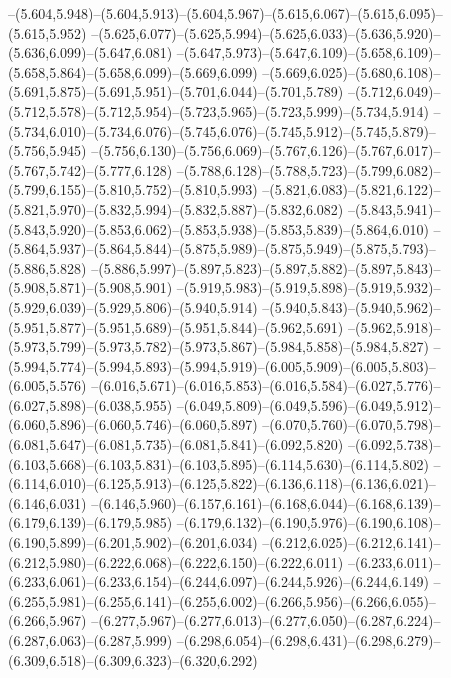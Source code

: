   --(5.604,5.948)--(5.604,5.913)--(5.604,5.967)--(5.615,6.067)--(5.615,6.095)--(5.615,5.952)%
  --(5.625,6.077)--(5.625,5.994)--(5.625,6.033)--(5.636,5.920)--(5.636,6.099)--(5.647,6.081)%
  --(5.647,5.973)--(5.647,6.109)--(5.658,6.109)--(5.658,5.864)--(5.658,6.099)--(5.669,6.099)%
  --(5.669,6.025)--(5.680,6.108)--(5.691,5.875)--(5.691,5.951)--(5.701,6.044)--(5.701,5.789)%
  --(5.712,6.049)--(5.712,5.578)--(5.712,5.954)--(5.723,5.965)--(5.723,5.999)--(5.734,5.914)%
  --(5.734,6.010)--(5.734,6.076)--(5.745,6.076)--(5.745,5.912)--(5.745,5.879)--(5.756,5.945)%
  --(5.756,6.130)--(5.756,6.069)--(5.767,6.126)--(5.767,6.017)--(5.767,5.742)--(5.777,6.128)%
  --(5.788,6.128)--(5.788,5.723)--(5.799,6.082)--(5.799,6.155)--(5.810,5.752)--(5.810,5.993)%
  --(5.821,6.083)--(5.821,6.122)--(5.821,5.970)--(5.832,5.994)--(5.832,5.887)--(5.832,6.082)%
  --(5.843,5.941)--(5.843,5.920)--(5.853,6.062)--(5.853,5.938)--(5.853,5.839)--(5.864,6.010)%
  --(5.864,5.937)--(5.864,5.844)--(5.875,5.989)--(5.875,5.949)--(5.875,5.793)--(5.886,5.828)%
  --(5.886,5.997)--(5.897,5.823)--(5.897,5.882)--(5.897,5.843)--(5.908,5.871)--(5.908,5.901)%
  --(5.919,5.983)--(5.919,5.898)--(5.919,5.932)--(5.929,6.039)--(5.929,5.806)--(5.940,5.914)%
  --(5.940,5.843)--(5.940,5.962)--(5.951,5.877)--(5.951,5.689)--(5.951,5.844)--(5.962,5.691)%
  --(5.962,5.918)--(5.973,5.799)--(5.973,5.782)--(5.973,5.867)--(5.984,5.858)--(5.984,5.827)%
  --(5.994,5.774)--(5.994,5.893)--(5.994,5.919)--(6.005,5.909)--(6.005,5.803)--(6.005,5.576)%
  --(6.016,5.671)--(6.016,5.853)--(6.016,5.584)--(6.027,5.776)--(6.027,5.898)--(6.038,5.955)%
  --(6.049,5.809)--(6.049,5.596)--(6.049,5.912)--(6.060,5.896)--(6.060,5.746)--(6.060,5.897)%
  --(6.070,5.760)--(6.070,5.798)--(6.081,5.647)--(6.081,5.735)--(6.081,5.841)--(6.092,5.820)%
  --(6.092,5.738)--(6.103,5.668)--(6.103,5.831)--(6.103,5.895)--(6.114,5.630)--(6.114,5.802)%
  --(6.114,6.010)--(6.125,5.913)--(6.125,5.822)--(6.136,6.118)--(6.136,6.021)--(6.146,6.031)%
  --(6.146,5.960)--(6.157,6.161)--(6.168,6.044)--(6.168,6.139)--(6.179,6.139)--(6.179,5.985)%
  --(6.179,6.132)--(6.190,5.976)--(6.190,6.108)--(6.190,5.899)--(6.201,5.902)--(6.201,6.034)%
  --(6.212,6.025)--(6.212,6.141)--(6.212,5.980)--(6.222,6.068)--(6.222,6.150)--(6.222,6.011)%
  --(6.233,6.011)--(6.233,6.061)--(6.233,6.154)--(6.244,6.097)--(6.244,5.926)--(6.244,6.149)%
  --(6.255,5.981)--(6.255,6.141)--(6.255,6.002)--(6.266,5.956)--(6.266,6.055)--(6.266,5.967)%
  --(6.277,5.967)--(6.277,6.013)--(6.277,6.050)--(6.287,6.224)--(6.287,6.063)--(6.287,5.999)%
  --(6.298,6.054)--(6.298,6.431)--(6.298,6.279)--(6.309,6.518)--(6.309,6.323)--(6.320,6.292)%
